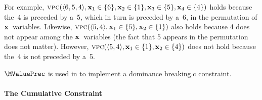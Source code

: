 For example, \mbox{$\mValuePrecChain(\langle 6, 5, 4 \rangle, \mVar{x}_1 \in
  \mSet{6}, \mVar{x}_2 \in \mSet{1}, \mVar{x}_3 \in \mSet{5}, \mVar{x}_4 \in
  \mSet{4})$} holds because the~4 is preceded by a~5, which in turn is preceded
by a~6, in the permutation of $\mVar{x}$~\glspl{variable}.
%
Likewise, \mbox{$\mValuePrecChain(\langle 5, 4 \rangle, \mVar{x}_1 \in \mSet{5},
  \mVar{x}_2 \in \mSet{1})$} also holds because 4 does not appear among the
$\mVar{x}$~\glspl{variable} (the fact that 5 appears in the permutation does
not matter).
%
However, \mbox{$\mValuePrecChain(\langle 5, 4 \rangle, \mVar{x}_1 \in \mSet{1},
  \mVar{x}_2 \in \mSet{4})$} does not hold because the~4 is not preceded by a~5.

$\MValuePrec$ is used in  to implement a
\gls{dominance breaking.c} \gls{constraint}.


\paragraph{The Cumulative Constraint}

